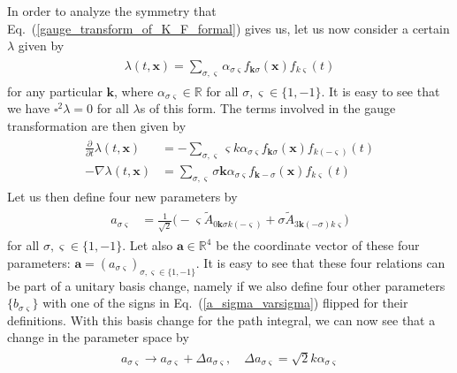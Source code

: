 \documentclass{article}
\begin{document}
In order to analyze the symmetry that Eq.\ (\ref{gauge_transform_of_K_F_formal}) gives us, let us now consider a certain $\lambda$ given by 
\begin{align}
\begin{aligned}
	\lambda(t, \mathbf{x}) = 
		\sum_{\sigma, \varsigma} 
			\alpha_{\sigma \varsigma}
			f_{\mathbf{k}\sigma}(\mathbf{x}) f_{k\varsigma}(t)
	\label{particular_lambda}
\end{aligned}
\end{align}
for any particular $\mathbf{k}$, where $\alpha_{\sigma \varsigma} \in\mathbb{R}$ for all $\sigma, \varsigma \in\{1, -1\}$. It is easy to see that we have $\square^2\lambda = 0$ for all $\lambda$s of this form. 
The terms involved in the gauge transformation are then given by
\begin{align}
\begin{aligned}
	\frac{\partial}{\partial t} \lambda(t, \mathbf{x}) &= 
		-\sum_{\sigma, \varsigma} 
			\varsigma k \alpha_{\sigma \varsigma}
			f_{\mathbf{k}\sigma}(\mathbf{x}) f_{k(-\varsigma)}(t)
	\\
	-\nabla \lambda(t, \mathbf{x}) &= 
		\sum_{\sigma, \varsigma} 
			\sigma \mathbf{k} \alpha_{\sigma \varsigma}
			f_{\mathbf{k}-\sigma}(\mathbf{x}) f_{k\varsigma}(t)
	\label{lambda_derivaties_both_equations_01}
\end{aligned}
\end{align}
Let us then define four new parameters by 
\begin{align}
\begin{aligned}
	a_{\sigma \varsigma} &= 
		\frac{1}{\sqrt{2}} \big(
			-\varsigma \widetilde A_{0 \mathbf{k} \sigma k (-\varsigma)} 
			+ 
			\sigma \widetilde A_{3 \mathbf{k} (-\sigma) k \varsigma} 
		\big)
	\label{a_sigma_varsigma}
\end{aligned}
\end{align}
for all $\sigma, \varsigma \in\{1, -1\}$. 
Let also $\mathbf{a}\in\mathbb{R}^4$ be the coordinate vector of these four parameters: $\mathbf{a} = (a_{\sigma\varsigma})_{\sigma, \varsigma \in\{1, -1\}}$. It is easy to see that these four relations can be part of a unitary basis change, namely if we also define four other parameters 
$\{b_{\sigma\varsigma}\}$ 
with one of the signs in Eq.\ (\ref{a_sigma_varsigma}) flipped for their definitions. With this basis change for the path integral, we can now see that a change in the parameter space by 
\begin{align}
\begin{aligned}
	a_{\sigma \varsigma} \to 
		a_{\sigma \varsigma} + \Delta a_{\sigma\varsigma},
	\quad
	\Delta a_{\sigma \varsigma} = \sqrt{2} k \alpha_{\sigma\varsigma}
	\label{a_change}
\end{aligned}
\end{align}
\end{document}
